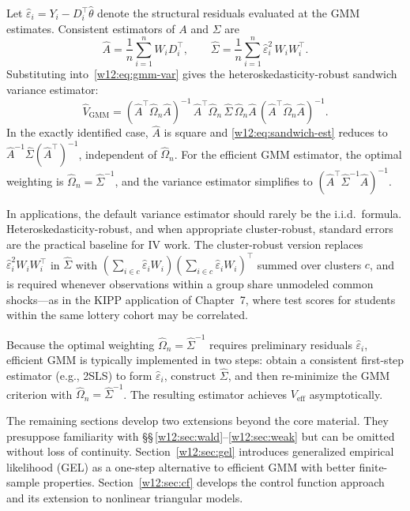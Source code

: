 \documentclass[master.tex]{subfiles}
\begin{document}
Let $\hat\varepsilon_i = Y_i - D_i^\top\hat\theta$ denote the
structural residuals evaluated at the GMM estimates.  Consistent
estimators of $A$ and $\Sigma$ are
\[
  \hat{A} = \frac{1}{n}\sum_{i=1}^n W_i D_i^\top,
  \qquad
  \hat\Sigma = \frac{1}{n}\sum_{i=1}^n \hat\varepsilon_i^2\, W_i W_i^\top.
\]
Substituting into~\eqref{w12:eq:gmm-var} gives the heteroskedasticity-robust
sandwich variance estimator:
\begin{equation}
  \hat{V}_{\mathrm{GMM}}
  = (\hat{A}^\top\hat\Omega_n\hat{A})^{-1}\,
    \hat{A}^\top\hat\Omega_n\,\hat\Sigma\,\hat\Omega_n\hat{A}\,
    (\hat{A}^\top\hat\Omega_n\hat{A})^{-1}.
  \label{w12:eq:sandwich-est}
\end{equation}
In the exactly identified case, $\hat{A}$ is square and
\eqref{w12:eq:sandwich-est} reduces to
$\hat{A}^{-1}\hat\Sigma(\hat{A}^\top)^{-1}$, independent of
$\hat\Omega_n$.  For the efficient GMM estimator, the optimal
weighting is $\hat\Omega_n = \hat\Sigma^{-1}$, and the variance
estimator simplifies to $(\hat{A}^\top\hat\Sigma^{-1}\hat{A})^{-1}$.

In applications, the default variance estimator should rarely be
the i.i.d.\ formula.  Heteroskedasticity-robust, and when appropriate
cluster-robust, standard errors are the practical baseline for IV
work.  The cluster-robust version replaces $\hat\varepsilon_i^2
W_i W_i^\top$ in $\hat\Sigma$ with $(\sum_{i \in c}\hat\varepsilon_i
W_i)(\sum_{i \in c}\hat\varepsilon_i W_i)^\top$ summed over clusters
$c$, and is required whenever observations within a group share
unmodeled common shocks---as in the KIPP application of Chapter~7,
where test scores for students within the same lottery cohort may be
correlated.

\begin{remark}
Because the optimal weighting $\hat\Omega_n = \hat\Sigma^{-1}$
requires preliminary residuals $\hat\varepsilon_i$, efficient GMM
is typically implemented in two steps: obtain a consistent first-step
estimator (e.g., 2SLS) to form $\hat\varepsilon_i$, construct
$\hat\Sigma$, and then re-minimize the GMM criterion with
$\hat\Omega_n = \hat\Sigma^{-1}$.  The resulting estimator achieves
$V_{\mathrm{eff}}$ asymptotically.
\end{remark}


\begin{tcolorbox}[warnstyle, title={Advanced Enrichment:
  Sections~\ref{w12:sec:gel}--\ref{w12:sec:cf}}]
The remaining sections develop two extensions beyond the core
material.  They presuppose familiarity with
\S\S\,\ref{w12:sec:wald}--\ref{w12:sec:weak} but can be omitted
without loss of continuity.  Section~\ref{w12:sec:gel} introduces
generalized empirical likelihood (GEL) as a one-step alternative to
efficient GMM with better finite-sample properties.
Section~\ref{w12:sec:cf} develops the control function approach and
its extension to nonlinear triangular models.
\end{tcolorbox}
\end{document}
